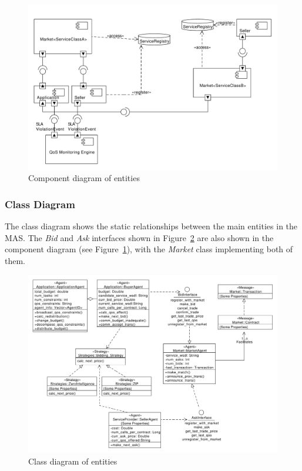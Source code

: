 \documentclass[10pt,journal,compsoc]{IEEEtran}
\begin{document}
\begin{figure}[htbp]
\centering
\includegraphics[scale=0.46]{drawings/Agent_Component_Diagram.pdf}
\caption{Component diagram of entities\label{fig:component_diagram}}
\end{figure}

\subsubsection{Class Diagram} The class diagram shows the static relationships between the main entities in the MAS. The \textit{Bid} and \textit{Ask} interfaces shown in Figure~\ref{fig:class_diagram} are also shown in the component diagram (see Figure~\ref{fig:component_diagram}), with the \textit{Market} class implementing both of them. 

\begin{figure}[htbp]
\centering
\includegraphics[scale=0.45]{drawings/Agent_Class_Diagram.pdf}
\caption{Class diagram of entities \label{fig:class_diagram}}
\end{figure}
\end{document}
